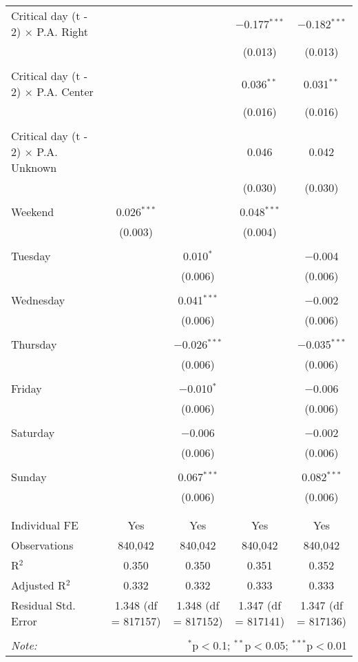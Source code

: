 \documentclass[
]{article}
\begin{document}
\begin{table}[!htbp]
{\begin{tabular}{@{\extracolsep{5pt}}lcccc}
 Critical day (t - 2) $\times$ P.A. Right &  &  & $-$0.177$^{***}$ & $-$0.182$^{***}$ \\ 
  &  &  & (0.013) & (0.013) \\ 
  & & & & \\ 
 Critical day (t - 2) $\times$ P.A. Center &  &  & 0.036$^{**}$ & 0.031$^{**}$ \\ 
  &  &  & (0.016) & (0.016) \\ 
  & & & & \\ 
 Critical day (t - 2) $\times$ P.A. Unknown &  &  & 0.046 & 0.042 \\ 
  &  &  & (0.030) & (0.030) \\ 
  & & & & \\ 
 Weekend & 0.026$^{***}$ &  & 0.048$^{***}$ &  \\ 
  & (0.003) &  & (0.004) &  \\ 
  & & & & \\ 
 Tuesday &  & 0.010$^{*}$ &  & $-$0.004 \\ 
  &  & (0.006) &  & (0.006) \\ 
  & & & & \\ 
 Wednesday &  & 0.041$^{***}$ &  & $-$0.002 \\ 
  &  & (0.006) &  & (0.006) \\ 
  & & & & \\ 
 Thursday &  & $-$0.026$^{***}$ &  & $-$0.035$^{***}$ \\ 
  &  & (0.006) &  & (0.006) \\ 
  & & & & \\ 
 Friday &  & $-$0.010$^{*}$ &  & $-$0.006 \\ 
  &  & (0.006) &  & (0.006) \\ 
  & & & & \\ 
 Saturday &  & $-$0.006 &  & $-$0.002 \\ 
  &  & (0.006) &  & (0.006) \\ 
  & & & & \\ 
 Sunday &  & 0.067$^{***}$ &  & 0.082$^{***}$ \\ 
  &  & (0.006) &  & (0.006) \\ 
  & & & & \\ 
\hline \\[-1.8ex] 
Individual FE & Yes & Yes & Yes & Yes \\ 
Observations & 840,042 & 840,042 & 840,042 & 840,042 \\ 
R$^{2}$ & 0.350 & 0.350 & 0.351 & 0.352 \\ 
Adjusted R$^{2}$ & 0.332 & 0.332 & 0.333 & 0.333 \\ 
Residual Std. Error & 1.348 (df = 817157) & 1.348 (df = 817152) & 1.347 (df = 817141) & 1.347 (df = 817136) \\ 
\hline 
\hline \\[-1.8ex] 
\textit{Note:}  & \multicolumn{4}{r}{$^{*}$p$<$0.1; $^{**}$p$<$0.05; $^{***}$p$<$0.01} \\ 
\end{tabular}
} 
\end{table} 
\newpage
\end{document}
